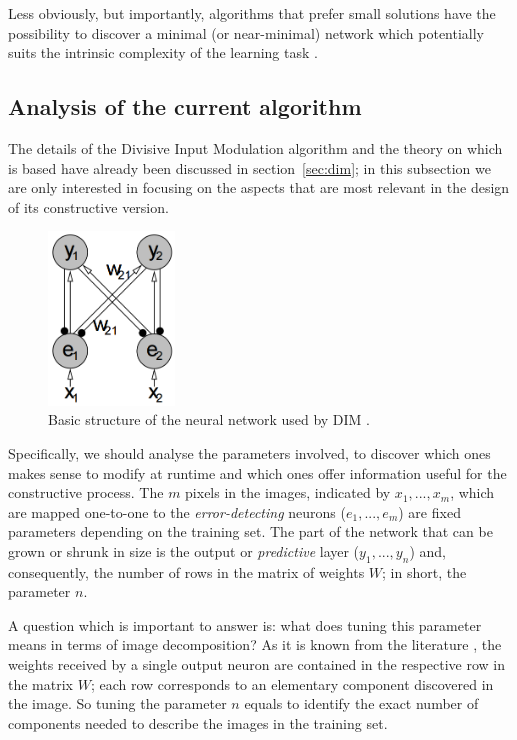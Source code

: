\documentclass[11pt,a4paper]{report}
\begin{document}
				Less obviously, but importantly, algorithms that prefer small solutions have the possibility to discover a minimal (or near-minimal) network which potentially suits the intrinsic complexity of the learning task \cite{parekh2000constructive}.

			\subsection{Analysis of the current algorithm}
				The details of the Divisive Input Modulation algorithm and the theory on which is based have already been discussed in section~\ref{sec:dim}; in this subsection we are only interested in focusing on the aspects that are most relevant in the design of its constructive version.

				\begin{figure}[h]
					\centering
					\includegraphics[width=0.3\textwidth]{basictopology}
					\caption{Basic structure of the neural network used by DIM \cite{spratling2009unsupervised}.}
					\label{fig:dim}
				\end{figure}

				Specifically, we should analyse the parameters involved, to discover which ones makes sense to modify at runtime and which ones offer information useful for the constructive process. The $m$ pixels in the images, indicated by $x_1, ..., x_m$, which are mapped one-to-one to the \emph{error-detecting} neurons ($e_1, ..., e_m$) are fixed parameters depending on the training set. The part of the network that can be grown or shrunk in size is the output or \emph{predictive} layer ($y_1, ..., y_n$) and, consequently, the number of rows in the matrix of weights $W$; in short, the parameter $n$.
				
				A question which is important to answer is: what does tuning this parameter means in terms of image decomposition? As it is known from the literature \cite{spratling2014predictive}, the weights received by a single output neuron are contained in the respective row in the matrix $W$; each row corresponds to an elementary component discovered in the image. So tuning the parameter $n$ equals to identify the exact number of components needed to describe the images in the training set.
				
\end{document}
